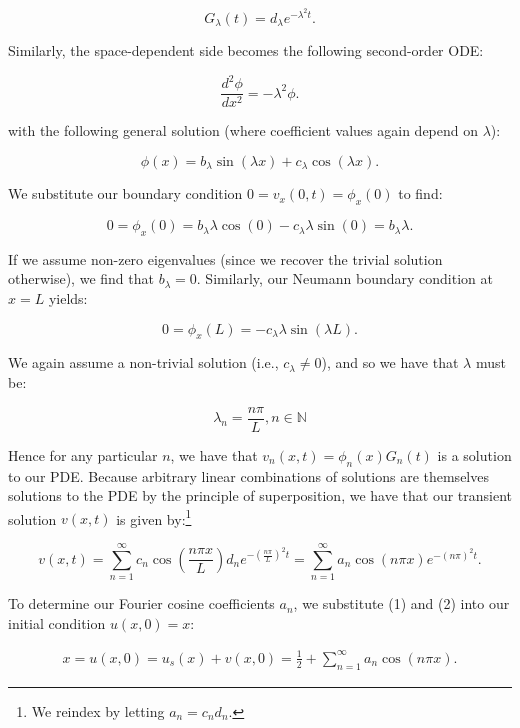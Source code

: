 \begin{solution}
    $$
    G_{\lambda}(t) = d_{\lambda}e^{-\lambda^2 t}.
    $$

    Similarly, the space-dependent side becomes the following second-order ODE:

    $$
    \frac{d^2 \phi}{d x^2} = -\lambda^2 \phi.
    $$

    with the following general solution (where coefficient values again depend on $\lambda$):

    $$
    \phi(x) = b_{\lambda} \sin{(\lambda x)} + c_{\lambda} \cos{(\lambda x)}.
    $$

    We substitute our boundary condition $0 = v_x(0, t) = \phi_x(0)$ to find:

    $$
    0 = \phi_x(0) = b_{\lambda} \lambda \cos{(0)} - c_{\lambda} \lambda \sin{(0)} = b_{\lambda} \lambda.
    $$

    If we assume non-zero eigenvalues (since we recover the trivial solution otherwise), we find that $b_{\lambda} = 0$.
    Similarly, our Neumann boundary condition at $x = L$ yields:

    $$
    0 = \phi_x(L) = -c_{\lambda} \lambda \sin{(\lambda L)}.
    $$

    We again assume a non-trivial solution (i.e., $c_{\lambda} \neq 0$), and so we have that $\lambda$ must be:

    $$
    \lambda_n = \frac{n \pi}{L}, n \in \mathbb{N}
    $$

    Hence for any particular $n$, we have that $v_n(x, t) = \phi_n(x)G_n(t)$ is a solution to our PDE. Because arbitrary
    linear combinations of solutions are themselves solutions to the PDE by the principle of superposition, we have that
    our transient solution $v(x, t)$ is given by:\footnote{
        We reindex by letting $a_n = c_n d_n$.
    }

    \begin{equation}
    v(x, t) = \sum\limits_{n=1}^{\infty}{c_n \cos{\left(\frac{n \pi x}{L}\right)}} d_n e^{-\left(\frac{n \pi}{L}\right)^2 t}
            = \sum\limits_{n=1}^{\infty}{a_n \cos{(n \pi x)}} e^{-(n \pi)^2 t}.
    \end{equation}

    To determine our Fourier cosine coefficients $a_n$, we substitute (1) and (2) into our initial condition 
    $u(x, 0) = x$:

    \begin{align*}
        x = u(x, 0) = u_s(x) + v(x, 0) = \frac{1}{2} + \sum\limits_{n=1}^{\infty}{a_n \cos{(n \pi x)}}.
    \end{align*}


\end{solution}

